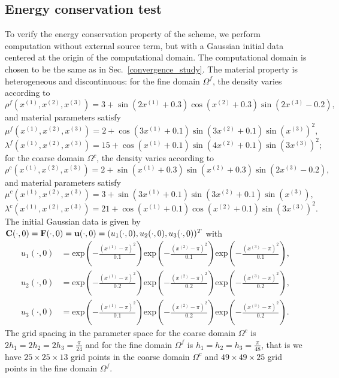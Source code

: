 \subsection{Energy conservation test}\label{conserved_energy}
To verify the energy conservation property of the scheme, we perform computation without external source term, but with a Gaussian initial data centered at the origin of the computational domain. The computational domain is chosen to be the same as in Sec.~\ref{convergence_study}. The material property is heterogeneous and discontinuous: for the fine domain $\Omega^f$,  the density varies according to
\[\rho^f(x^{(1)},x^{(2)},x^{(3)}) = 3 + \sin(2x^{(1)}+0.3)\cos(x^{(2)}+0.3)\sin(2x^{(3)}-0.2),\] 
and material parameters satisfy
\[\mu^f(x^{(1)},x^{(2)},x^{(3)}) = 2 + \cos(3x^{(1)}+0.1)\sin(3x^{(2)}+0.1)\sin(x^{(3)})^2,\]
\[\lambda^f(x^{(1)},x^{(2)},x^{(3)}) = 15 + \cos(x^{(1)}+0.1)\sin(4x^{(2)}+0.1)\sin(3x^{(3)})^2;\]
for the coarse domain $\Omega^c$, the density varies according to
\[\rho^c(x^{(1)},x^{(2)},x^{(3)}) = 2 + \sin(x^{(1)}+0.3)\sin(x^{(2)}+0.3)\sin(2x^{(3)}-0.2),\] 
and material parameters satisfy
\[\mu^c(x^{(1)},x^{(2)},x^{(3)}) = 3 + \sin(3x^{(1)}+0.1)\sin(3x^{(2)}+0.1)\sin(x^{(3)}),\]
\[\lambda^c(x^{(1)},x^{(2)},x^{(3)}) = 21 + \cos(x^{(1)}+0.1)\cos(x^{(2)}+0.1)\sin(3x^{(3)})^2.\]
The initial Gaussian data is given by ${\bf C}(\cdot,0) = {\bf F}(\cdot,0) = {\bf u}(\cdot,0) = (u_1(\cdot,0),u_2(\cdot,0),u_3(\cdot,0))^T$ with
\begin{align*}
	u_1(\cdot,0) &= \mbox{exp}\left(-\frac{(x^{(1)}-\pi)^2}{0.1}\right)\mbox{exp}\left(-\frac{(x^{(2)}-\pi)^2}{0.1}\right)\mbox{exp}\left(-\frac{(x^{(3)}-\pi)^2}{0.1}\right),\\
	u_2(\cdot,0) &= \mbox{exp}\left(-\frac{(x^{(1)}-\pi)^2}{0.2}\right)\mbox{exp}\left(-\frac{(x^{(2)}-\pi)^2}{0.2}\right)\mbox{exp}\left(-\frac{(x^{(3)}-\pi)^2}{0.2}\right),\\
	u_3(\cdot,0) &= \mbox{exp}\left(-\frac{(x^{(1)}-\pi)^2}{0.1}\right)\mbox{exp}\left(-\frac{(x^{(2)}-\pi)^2}{0.2}\right)\mbox{exp}\left(-\frac{(x^{(3)}-\pi)^2}{0.2}\right).
\end{align*}
 The grid spacing in the parameter space for the coarse domain $\Omega^c$ is $2h_1 = 2h_2 = 2h_3 = \frac{\pi}{24}$ and for the fine domain $\Omega^f$ is $h_1 = h_2 = h_3 = \frac{\pi}{48}$, that is we have $25\times25\times13$ grid points in the coarse domain $\Omega^c$ and $49\times49\times25$ grid points in the fine domain $\Omega^f$. 

